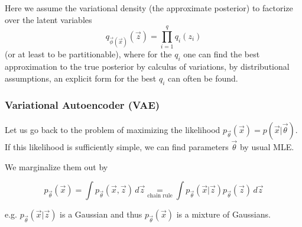Here we assume the variational density (the approximate posterior) to factorize over the latent variables
\begin{equation}
    q_{\vec{\phi}(\vec{x})}(\vec{z}) = \prod_{i=1}^{q} q_i(z_i)
\end{equation}
(or at least to be partitionable), where for the $q_i$ one can find
the best approximation to the true posterior by calculus of variations,
by distributional assumptions, an explicit form for the best $q_i$ can
often be found.

\subsubsection{Variational Autoencoder (VAE)}


Let us go back to the problem of maximizing the likelihood
$p_\vec{\theta}(\vec{x}) = p(\vec{x}|\vec{\theta})$.
If this likelihood is sufficiently simple, we can find 
parameters $\vec{\theta}$ by usual MLE.


We marginalize them out by

\begin{equation}
    p_\vec{\theta}(\vec{x}) = \int p_\vec{\theta}(\vec{x},\vec{z}) \, d\vec{z} \underset{\text{chain rule}}{=} \int p_\vec{\theta}(\vec{x}|\vec{z}) p_\vec{\theta}(\vec{z}) \, d\vec{z}
\end{equation}

e.g. $p_\vec{\theta}(\vec{x}|\vec{z})$ is a Gaussian and thus $p_\vec{\theta}(\vec{x})$ is a mixture of Gaussians.


